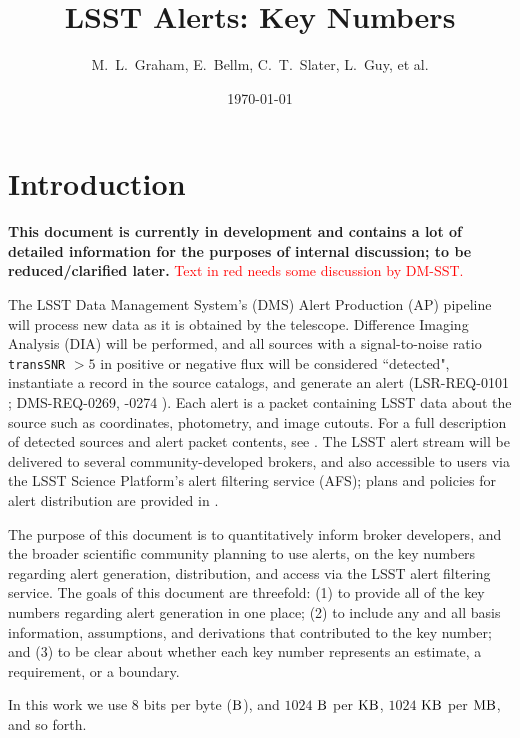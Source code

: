 \documentclass[DM,authoryear,toc]{lsstdoc}
\title[Alerts Key Numbers]{LSST Alerts: Key Numbers}
\author{%
M.~L.~Graham, E.~Bellm, C.~T.~Slater, L.~Guy, et al.
}
\date{\today}
\begin{document}
\maketitle

\section{Introduction} \label{sec:intro}

{\bf This document is currently in development and contains a lot of detailed information for the purposes of internal discussion; to be reduced/clarified later.} \textcolor{red}{Text in red needs some discussion by DM-SST.}

The LSST Data Management System's (DMS) Alert Production (AP) pipeline will process new data as it is obtained by the telescope. Difference Imaging Analysis (DIA) will be performed, and all sources with a signal-to-noise ratio {\tt transSNR} $>5$ in positive or negative flux will be considered ``detected", instantiate a record in the source catalogs, and generate an alert (LSR-REQ-0101 ; DMS-REQ-0269, -0274 ). Each alert is a packet containing LSST data about the source such as coordinates, photometry, and image cutouts. For a full description of detected sources and alert packet contents, see . The LSST alert stream will be delivered to several community-developed brokers, and also accessible to users via the LSST Science Platform's alert filtering service (AFS); plans and policies for alert distribution are provided in . 

The purpose of this document is to quantitatively inform broker developers, and the broader scientific community planning to use alerts, on the key numbers regarding alert generation, distribution, and access via the LSST alert filtering service. The goals of this document are threefold: (1) to provide all of the key numbers regarding alert generation in one place; (2) to include any and all basis information, assumptions, and derivations that contributed to the key number; and (3) to be clear about whether each key number represents an estimate, a requirement, or a boundary. 

In this work we use 8 bits per byte ($\rm B$), and $1024$ $\rm B$ per $\rm KB$, $1024$ $\rm KB$ per $\rm MB$, and so forth.
\end{document}
